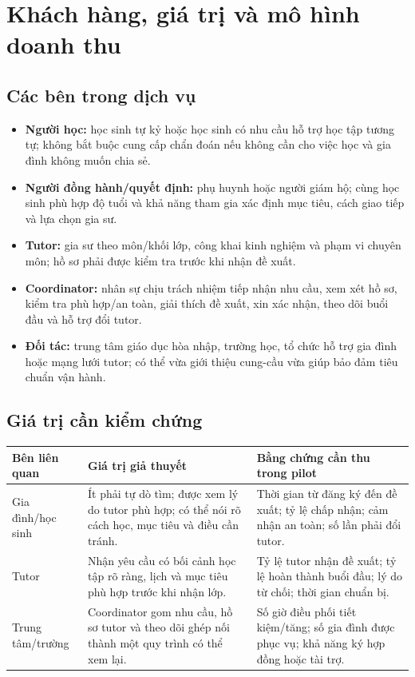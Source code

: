 \documentclass[11pt,a4paper]{article}
\begin{document}
\section{Khách hàng, giá trị và mô hình doanh thu}

\subsection{Các bên trong dịch vụ}

\begin{itemize}
  \item \textbf{Người học:} học sinh tự kỷ hoặc học sinh có nhu cầu hỗ trợ học
  tập tương tự; không bắt buộc cung cấp chẩn đoán nếu không cần cho việc học và
  gia đình không muốn chia sẻ.
  \item \textbf{Người đồng hành/quyết định:} phụ huynh hoặc người giám hộ; cùng
  học sinh phù hợp độ tuổi và khả năng tham gia xác định mục tiêu, cách giao
  tiếp và lựa chọn gia sư.
  \item \textbf{Tutor:} gia sư theo môn/khối lớp, công khai kinh nghiệm và phạm
  vi chuyên môn; hồ sơ phải được kiểm tra trước khi nhận đề xuất.
  \item \textbf{Coordinator:} nhân sự chịu trách nhiệm tiếp nhận nhu cầu, xem
  xét hồ sơ, kiểm tra phù hợp/an toàn, giải thích đề xuất, xin xác nhận, theo
  dõi buổi đầu và hỗ trợ đổi tutor.
  \item \textbf{Đối tác:} trung tâm giáo dục hòa nhập, trường học, tổ chức hỗ
  trợ gia đình hoặc mạng lưới tutor; có thể vừa giới thiệu cung-cầu vừa giúp
  bảo đảm tiêu chuẩn vận hành.
\end{itemize}

\subsection{Giá trị cần kiểm chứng}

\begin{tabularx}{\textwidth}{p{3.0cm}Y Y}
\toprule
\textbf{Bên liên quan} & \textbf{Giá trị giả thuyết} & \textbf{Bằng chứng cần
thu trong pilot} \\
\midrule
Gia đình/học sinh & Ít phải tự dò tìm; được xem lý do tutor phù hợp; có thể
nói rõ cách học, mục tiêu và điều cần tránh. &
Thời gian từ đăng ký đến đề xuất; tỷ lệ chấp nhận; cảm nhận an toàn; số lần
phải đổi tutor. \\
Tutor & Nhận yêu cầu có bối cảnh học tập rõ ràng, lịch và mục tiêu phù hợp
trước khi nhận lớp. &
Tỷ lệ tutor nhận đề xuất; tỷ lệ hoàn thành buổi đầu; lý do từ chối; thời gian
chuẩn bị. \\
Trung tâm/trường & Coordinator gom nhu cầu, hồ sơ tutor và theo dõi ghép nối
thành một quy trình có thể xem lại. &
Số giờ điều phối tiết kiệm/tăng; số gia đình được phục vụ; khả năng ký hợp
đồng hoặc tài trợ. \\
\bottomrule
\end{tabularx}
\end{document}
